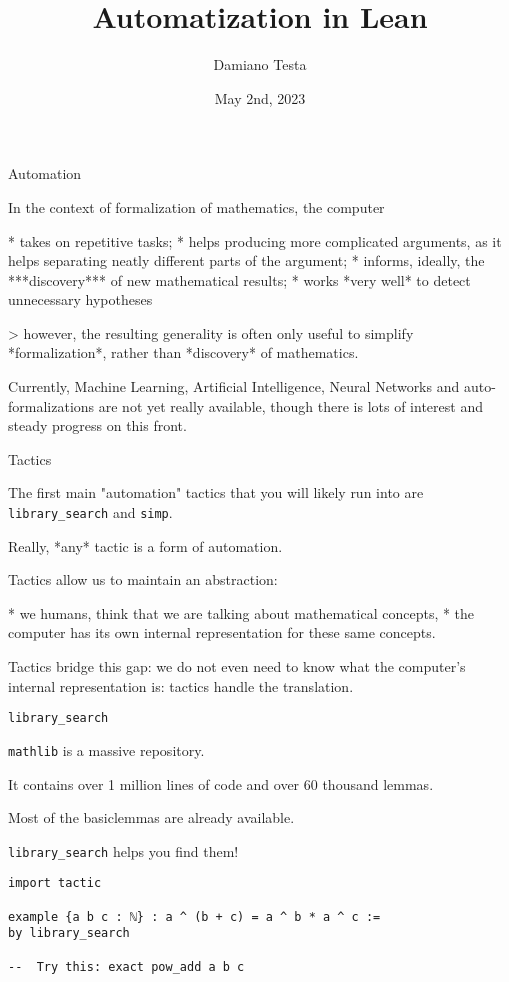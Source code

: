 \documentclass{beamer}
\title{Automatization in Lean}
\author{Damiano Testa}
\institute{University of Warwick}
\date{May 2nd, 2023}
\begin{document}
\frame{\titlepage}

\begin{frame}[fragile]
{Automation}

In the context of formalization of mathematics, the computer

* takes on repetitive tasks;
* helps producing more complicated arguments, as it helps separating neatly different parts of the argument;
* informs, ideally, the ***discovery*** of new mathematical results;
* works *very well* to detect unnecessary hypotheses

  > however, the resulting generality is often only useful to simplify *formalization*, rather than *discovery* of mathematics.


Currently, Machine Learning, Artificial Intelligence, Neural Networks and auto-formalizations are not yet really available, though there is lots of interest and steady progress on this front.
\end{frame}

\begin{frame}[fragile]{Tactics}

The first main "automation" tactics that you will likely run into are {\verb`library_search`} and {\verb`simp`}.

Really, *any* tactic is a form of automation.

Tactics allow us to maintain an abstraction:

*  we humans, think that we are talking about mathematical concepts,
*  the computer has its own internal representation for these same concepts.

Tactics bridge this gap: we do not even need to know what the computer's internal representation is: tactics handle the translation.
\end{frame}

\begin{frame}[fragile]{{\texttt{library\_search}}}

{\verb`mathlib`} is a massive repository.

It contains over 1 million lines of code and over 60 thousand lemmas.

Most of the basic\footnotemark lemmas are already available.

{\verb`library_search`} helps you find them!

\begin{verbatim}
import tactic

example {a b c : ℕ} : a ^ (b + c) = a ^ b * a ^ c :=
by library_search

--  Try this: exact pow_add a b c
\end{verbatim}

\end{frame}
\end{document}
